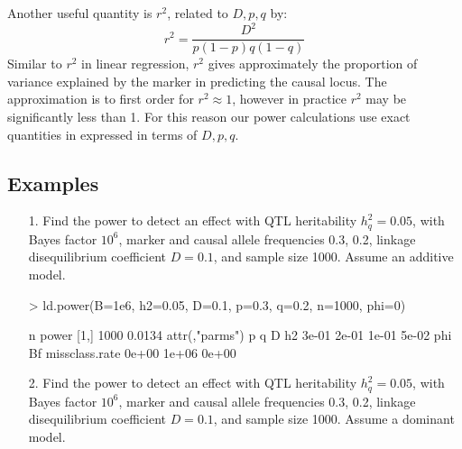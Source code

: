 \documentclass[a4paper,10pt]{amsart}
\begin{document}
Another useful quantity is $r^2$, related to $D,p,q$ by:
\begin{equation}
\label{eq:rsquared}
r^2 = \frac{D^2}{p(1-p)q(1-q)}
\end{equation}
Similar to $r^2$ in linear regression, $r^2$ gives approximately the
proportion of variance explained by the marker in predicting the
causal locus.  The approximation is to first order for $r^2 \approx
1$, however in practice $r^2$ may be significantly less than 1. For
this reason our power calculations use exact quantities in expressed in terms of
$D,p,q$.

\subsection{Examples}
\begin{itemize}
\item[1.] Find the power to detect an effect with QTL heritability
  $h^2_q = 0.05$, with   Bayes factor $10^6$, marker and causal allele
  frequencies 0.3, 0.2,  linkage disequilibrium coefficient $D=0.1$, 
  and sample size 1000.  Assume an additive model.

\begin{Schunk}
\begin{Sinput}
> ld.power(B=1e6, h2=0.05, D=0.1, p=0.3, q=0.2, n=1000, phi=0)
\end{Sinput}
\begin{Soutput}
        n  power
[1,] 1000 0.0134
attr(,"parms")
             p              q              D             h2 
         3e-01          2e-01          1e-01          5e-02 
           phi             Bf missclass.rate 
         0e+00          1e+06          0e+00 
\end{Soutput}
\end{Schunk}
\item[2.] Find the power to detect an effect with QTL heritability
  $h^2_q = 0.05$, with   Bayes factor $10^6$, marker and causal allele
  frequencies 0.3, 0.2,  linkage disequilibrium coefficient $D=0.1$, 
  and sample size 1000.  Assume a dominant model.


\end{itemize}
\end{document}
